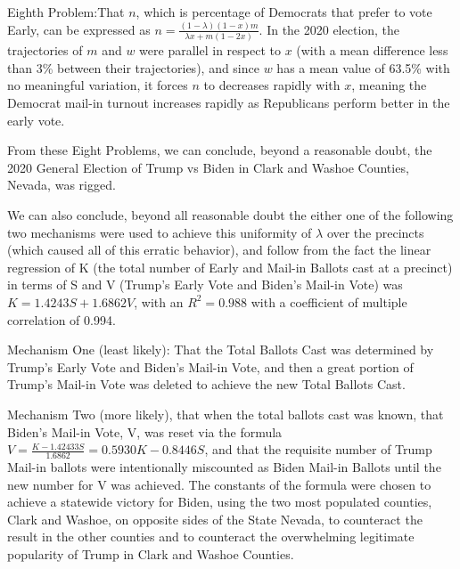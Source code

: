 \documentclass[preprint,13pt]{elsarticle}
\begin{document}
Eighth Problem:That $n$, which is percentage of Democrats that prefer to vote Early, can be expressed as $n=\frac{(1-\lambda)(1-x)m}{\lambda x+m(1-2x)}$. In the 2020 election, the trajectories of $m$ and $w$ were parallel in respect to $x$ (with a mean difference less than 3\% between their trajectories), and since $w$ has a mean value of 63.5\% with no meaningful variation, it forces $n$ to decreases rapidly with $x$, meaning the Democrat mail-in turnout increases rapidly as Republicans perform better in the early vote.

From these Eight Problems, we can conclude, beyond a reasonable doubt, the 2020 General Election of Trump vs Biden in Clark and Washoe Counties, Nevada, was rigged.

We can also conclude, beyond all reasonable doubt the either one of the following two mechanisms were used to achieve this uniformity of $\lambda$ over the precincts (which caused all of this erratic behavior), and follow from the fact the linear regression of K (the total number of Early and Mail-in Ballots cast at a precinct) in terms of S and V (Trump's Early Vote and Biden's Mail-in Vote) was $K=1.4243S+1.6862V$, with an $R^2=0.988$ with a coefficient of multiple correlation of 0.994.

Mechanism One (least likely): That the Total Ballots Cast was determined by Trump's Early Vote and Biden's Mail-in Vote, and then a great portion of Trump's Mail-in Vote was deleted to achieve the new Total Ballots Cast.

Mechanism Two (more likely), that when the total ballots cast was known, that Biden's Mail-in Vote, V, was reset via the formula $V=\frac{K-1.42433S}{1.6862}=0.5930K-0.8446S$, and that the requisite number of Trump Mail-in ballots were intentionally miscounted as Biden Mail-in Ballots until the new number for V was achieved. The constants of the formula were chosen to achieve a statewide victory for Biden, using the two most populated counties, Clark and Washoe, on opposite sides of the State Nevada, to counteract the result in the other counties and to counteract the overwhelming legitimate popularity of Trump in Clark and Washoe Counties.
\end{document}
